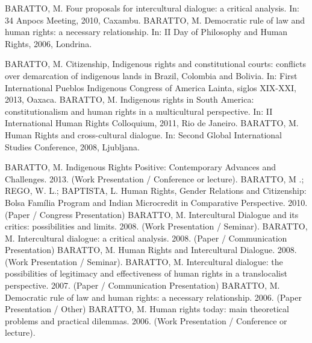 
\begin{cvcitems}
  \cvcitem
    {BARATTO, M.}
    {Four proposals for intercultural dialogue: a critical analysis. In: 34 Anpocs Meeting, 2010, Caxambu.}
  \cvcitem
    {BARATTO, M.}
    {Democratic rule of law and human rights: a necessary relationship. In: II Day of Philosophy and Human Rights, 2006, Londrina.}
\end{cvcitems}


\begin{cvcitems}
  \cvcitem
      {BARATTO, M.}
      {Citizenship, Indigenous rights and constitutional courts: conflicts over demarcation of indigenous lands in Brazil, Colombia and Bolivia. In: First International Pueblos Indigenous Congress of America Lainta, siglos XIX-XXI, 2013, Oaxaca.}
  \cvcitem
      {BARATTO, M.}
      {Indigenous rights in South America: constitutionalism and human rights in a multicultural perspective. In: II International Human Rights Colloquium, 2011, Rio de Janeiro.}
  \cvcitem
      {BARATTO, M.}
      {Human Rights and cross-cultural dialogue. In: Second Global International Studies Conference, 2008, Ljubljana.}
\end{cvcitems}


\begin{cvcitems}
  \cvcitem
      {BARATTO, M.}
      {Indigenous Rights Positive: Contemporary Advances and Challenges. 2013. (Work Presentation / Conference or lecture).}
  \cvcitem
      {BARATTO, M .; REGO, W. L.; BAPTISTA, L.}
      {Human Rights, Gender Relations and Citizenship: Bolsa Família Program and Indian Microcredit in Comparative Perspective. 2010. (Paper / Congress Presentation)}
  \cvcitem
      {BARATTO, M.}
      {Intercultural Dialogue and its critics: possibilities and limits. 2008. (Work Presentation / Seminar).}
  \cvcitem
      {BARATTO, M.}
      {Intercultural dialogue: a critical analysis. 2008. (Paper / Communication Presentation)}
  \cvcitem
      {BARATTO, M.}
      {Human Rights and Intercultural Dialogue. 2008. (Work Presentation / Seminar).}
  \cvcitem
      {BARATTO, M.}
      {Intercultural dialogue: the possibilities of legitimacy and effectiveness of human rights in a translocalist perspective. 2007. (Paper / Communication Presentation)}
  \cvcitem
      {BARATTO, M.}
      {Democratic rule of law and human rights: a necessary relationship. 2006. (Paper Presentation / Other)}
  \cvcitem
      {BARATTO, M.}
      {Human rights today: main theoretical problems and practical dilemmas. 2006. (Work Presentation / Conference or lecture).}\end{cvcitems}

